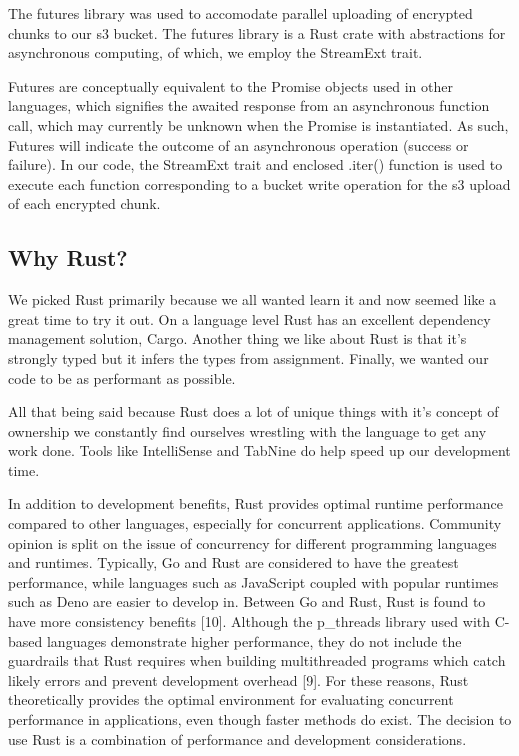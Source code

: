 \documentclass[conference]{IEEEtran}
\begin{document}
The futures library was used to accomodate parallel uploading of encrypted chunks to our s3 bucket. The futures library is a
Rust crate with abstractions for asynchronous computing, of which, we employ the StreamExt trait.

Futures are conceptually equivalent to the Promise objects used in other 
languages, which signifies the awaited response from an asynchronous function call, which may currently be unknown when the Promise
is instantiated. As such, Futures will indicate the outcome of an asynchronous operation (success or failure). In our code, the StreamExt 
trait and enclosed .iter() function is used to execute each function corresponding to a bucket write operation for the s3 upload of each 
encrypted chunk.


\subsection{Why Rust?}

We picked Rust primarily because we all wanted learn it and now seemed like a great time to try it out.
On a language level Rust has an excellent dependency management solution, Cargo.
Another thing we like about Rust is that it's strongly typed but it infers the types from assignment.
Finally, we wanted our code to be as performant as possible.

All that being said because Rust does a lot of unique things with it's concept of ownership we constantly
find ourselves wrestling with the language to get any work done.
Tools like IntelliSense and TabNine do help speed up our development time.

In addition to development benefits, Rust provides optimal runtime performance compared to other languages,
especially for concurrent applications. Community opinion is split on the issue of concurrency for different
programming languages and runtimes. Typically, Go and Rust are considered to have the greatest performance,
while languages such as JavaScript coupled with popular runtimes such as Deno are easier to develop in. Between
Go and Rust, Rust is found to have more consistency benefits [10]. Although the p\_threads library used with C-based
languages demonstrate higher performance, they do not include the guardrails that Rust requires when building
multithreaded programs which catch likely errors and prevent development overhead [9]. For these reasons, Rust theoretically 
provides the optimal environment for evaluating concurrent performance in applications, even though faster methods do 
exist. The decision to use Rust is a combination of performance and development considerations.
\end{document}
